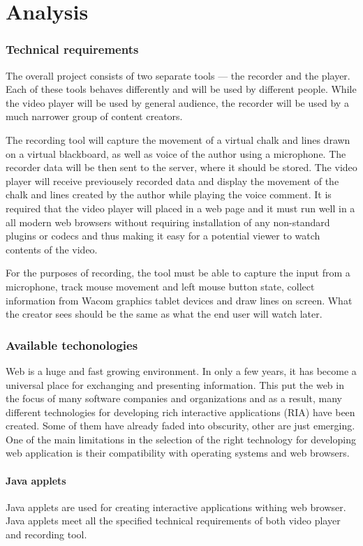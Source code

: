 \chapter{Analysis}

\subsection{Technical requirements}
The overall project consists of two separate tools --- the recorder and the player. Each of these tools behaves differently and will be used by different people. While the video player will be used by general audience, the recorder will be used by a much narrower group of content creators.

The recording tool will capture the movement of a virtual chalk and lines drawn on a virtual blackboard, as well as voice of the author using a microphone. The recorder data will be then sent to the server, where it should be stored. The video player will receive previousely recorded data and display the movement of the chalk and lines created by the author while playing the voice comment. It is required that the video player will placed in a web page and it must run well in a all modern web browsers without requiring installation of any non-standard plugins or codecs and thus making it easy for a potential viewer to watch contents of the video.

For the purposes of recording, the tool must be able to capture the input from a microphone, track mouse movement and left mouse button state, collect information from Wacom graphics tablet devices and draw lines on screen. What the creator sees should be the same as what the end user will watch later.

\subsection{Available techonologies}
Web is a huge and fast growing environment. In only a few years, it has become a universal place for exchanging and presenting information. This put the web in the focus of many software companies and organizations and as a result, many different technologies for developing rich interactive applications (RIA) have been created. Some of them have already faded into obscurity, other are just emerging. One of the main limitations in the selection of the right technology for developing web application is their compatibility with operating systems and web browsers.

\subsubsection{Java applets}
Java applets are used for creating interactive applications withing web browser. Java applets meet all the specified technical requirements of both video player and recording tool.

